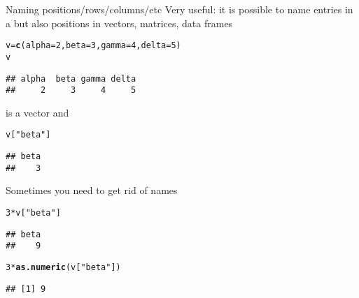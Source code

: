 \documentclass[aspectratio=169]{beamer}\usepackage[]{graphicx}\usepackage[]{xcolor}
\makeatletter
\newcommand{\hlnum}[1]{\textcolor[rgb]{0.686,0.059,0.569}{#1}}%
\newcommand{\hlsng}[1]{\textcolor[rgb]{0.192,0.494,0.8}{#1}}%
\newcommand{\hlopt}[1]{\textcolor[rgb]{0,0,0}{#1}}%
\newcommand{\hldef}[1]{\textcolor[rgb]{0.345,0.345,0.345}{#1}}%
\newcommand{\hlkwb}[1]{\textcolor[rgb]{0.69,0.353,0.396}{#1}}%
\newcommand{\hlkwc}[1]{\textcolor[rgb]{0.333,0.667,0.333}{#1}}%
\newcommand{\hlkwd}[1]{\textcolor[rgb]{0.737,0.353,0.396}{\textbf{#1}}}%
\newenvironment{kframe}{%
 \def\at@end@of@kframe{}%
 \ifinner\ifhmode%
  \def\at@end@of@kframe{\end{minipage}}%
  \begin{minipage}{\columnwidth}%
 \fi\fi%
 \def\FrameCommand##1{\hskip\@totalleftmargin \hskip-\fboxsep
 \colorbox{shadecolor}{##1}\hskip-\fboxsep
     \hskip-\linewidth \hskip-\@totalleftmargin \hskip\columnwidth}%
 \MakeFramed {\advance\hsize-\width
   \@totalleftmargin\z@ \linewidth\hsize
   \@setminipage}}%
 {\par\unskip\endMakeFramed%
 \at@end@of@kframe}
\newenvironment{knitrout}{}{} %
\makeatother
\begin{document}
\begin{frame}[fragile]{Naming positions/rows/columns/etc}
Very useful: it is possible to name entries in a  but also positions in vectors, matrices, data frames
\begin{knitrout}
\color{fgcolor}\begin{kframe}
\begin{alltt}
\hldef{v} \hlkwb{=} \hlkwd{c}\hldef{(}\hlkwc{alpha} \hldef{=} \hlnum{2}\hldef{,} \hlkwc{beta} \hldef{=} \hlnum{3}\hldef{,} \hlkwc{gamma} \hldef{=} \hlnum{4}\hldef{,} \hlkwc{delta} \hldef{=} \hlnum{5}\hldef{)}
\hldef{v}
\end{alltt}
\begin{verbatim}
## alpha  beta gamma delta 
##     2     3     4     5
\end{verbatim}
\end{kframe}
\end{knitrout}
is a vector and 
\begin{knitrout}
\color{fgcolor}\begin{kframe}
\begin{alltt}
\hldef{v[}\hlsng{"beta"}\hldef{]}
\end{alltt}
\begin{verbatim}
## beta 
##    3
\end{verbatim}
\end{kframe}
\end{knitrout}
\end{frame}

\begin{frame}[fragile]{Sometimes you need to get rid of names}
\begin{knitrout}
\color{fgcolor}\begin{kframe}
\begin{alltt}
\hlnum{3} \hlopt{*} \hldef{v[}\hlsng{"beta"}\hldef{]}
\end{alltt}
\begin{verbatim}
## beta 
##    9
\end{verbatim}
\begin{alltt}
\hlnum{3} \hlopt{*} \hlkwd{as.numeric}\hldef{(v[}\hlsng{"beta"}\hldef{])}
\end{alltt}
\begin{verbatim}
## [1] 9
\end{verbatim}
\end{kframe}
\end{knitrout}
\end{frame}
\end{document}
